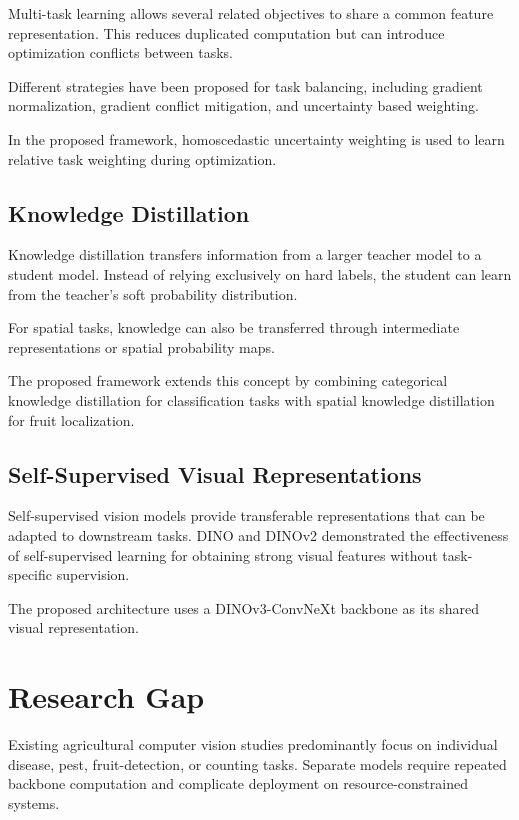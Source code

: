 \documentclass[preprint,12pt]{elsarticle}
\begin{document}
Multi-task learning allows several related objectives to share a common
feature representation. This reduces duplicated computation but can
introduce optimization conflicts between tasks.

Different strategies have been proposed for task balancing, including
gradient normalization, gradient conflict mitigation, and uncertainty
based weighting.

In the proposed framework, homoscedastic uncertainty weighting is used
to learn relative task weighting during optimization.

\subsection{Knowledge Distillation}

Knowledge distillation transfers information from a larger teacher model
to a student model. Instead of relying exclusively on hard labels, the
student can learn from the teacher's soft probability distribution.

For spatial tasks, knowledge can also be transferred through intermediate
representations or spatial probability maps.

The proposed framework extends this concept by combining categorical
knowledge distillation for classification tasks with spatial knowledge
distillation for fruit localization.

\subsection{Self-Supervised Visual Representations}

Self-supervised vision models provide transferable representations that
can be adapted to downstream tasks. DINO and DINOv2 demonstrated the
effectiveness of self-supervised learning for obtaining strong visual
features without task-specific supervision.

The proposed architecture uses a DINOv3-ConvNeXt backbone as its shared
visual representation.


\section{Research Gap}
\label{sec:gap}

Existing agricultural computer vision studies predominantly focus on
individual disease, pest, fruit-detection, or counting tasks. Separate
models require repeated backbone computation and complicate deployment
on resource-constrained systems.
\end{document}

